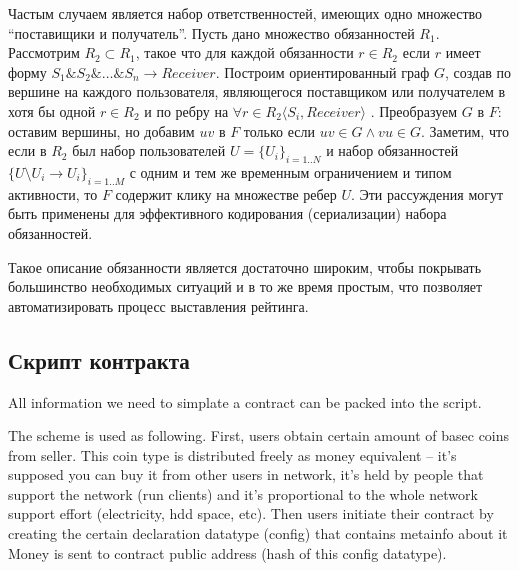 \documentclass[]{itmo-student-thesis}
\begin{document}
Частым случаем является набор ответственностей, имеющих одно множество
``поставищики и получатель''. Пусть дано множество обязанностей
$R_1$. Рассмотрим $R_2 \subset R_1$, такое что для каждой обязанности
$r \in R_2$ если $r$ имеет форму $S_1\&S_2\&…\&S_n \rightarrow Receiver$. Построим ориентированный граф $G$, создав по вершине на
каждого пользователя, являющегося поставщиком или получателем в хотя
бы одной $r \in R_2$ и по ребру на $\forall r \in R_2 \langle S_i,
Receiver \rangle$ . Преобразуем $G$ в $F$: оставим вершины, но добавим
$uv$ в $F$ только если $uv \in G \wedge vu \in G$. Заметим, что если в
$R_2$ был набор пользователей $U = \{U_i\}_{i=1..N}$ и набор
обязанностей $\{U \setminus U_i \rightarrow U_i\}_{i=1..M}$ с
одним и тем же временным ограничением и типом активности, то $F$
содержит клику на множестве ребер $U$. Эти рассуждения могут быть
применены для эффективного кодирования (сериализации) набора
обязанностей.

Такое описание обязанности является достаточно широким, чтобы
покрывать большинство необходимых ситуаций и в то же время простым,
что позволяет автоматизировать процесс выставления рейтинга.

\subsection{Скрипт контракта}

All information we need to simplate a contract can be packed into the
script.

The scheme is used as following. First, users obtain certain amount of
basec coins from seller. This coin type is distributed freely as money
equivalent -- it’s supposed you can buy it from other users in
network, it’s held by people that support the network (run clients)
and it’s proportional to the whole network support effort
(electricity, hdd space, etc). Then users initiate their contract by
creating the certain declaration datatype (config) that contains
metainfo about it Money is sent to contract public address (hash of
this config datatype).
\end{document}

